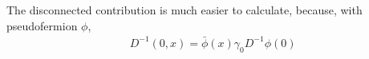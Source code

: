 The disconnected contribution is much easier to calculate, because, with pseudofermion $\phi$,
\begin{equation}
\begin{split}
&D^{-1}(0,x) = \bar{\phi} (x) \gamma _0 D^{-1} \phi (0)\\
\end{split}
\end{equation}


